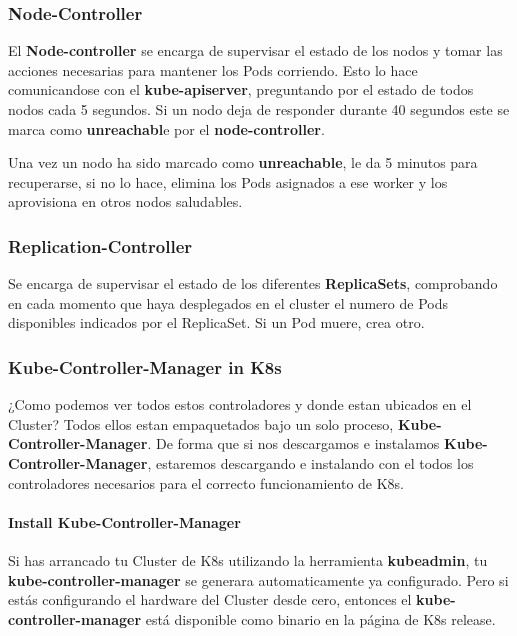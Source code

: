 \documentclass{article}
\begin{document}
\subsubsection{Node-Controller}
El \textbf{Node-controller} se encarga de supervisar el estado de los nodos y tomar las acciones necesarias para mantener los Pods corriendo. Esto lo hace comunicandose con el \textbf{kube-apiserver}, preguntando por el estado de todos nodos cada 5 segundos. Si un nodo deja de responder durante 40 segundos este se marca como \textbf{unreachabl}e por el \textbf{node-controller}.

Una vez un nodo ha sido marcado como \textbf{unreachable}, le da 5 minutos para recuperarse, si no lo hace, elimina los Pods asignados a ese worker y los aprovisiona en otros nodos saludables.

\subsubsection{Replication-Controller}
Se encarga de supervisar el estado de los diferentes \textbf{ReplicaSets}, comprobando en cada momento que haya desplegados en el cluster el numero de Pods disponibles indicados por el ReplicaSet. Si un Pod muere, crea otro.

\subsubsection{Kube-Controller-Manager in K8s}

¿Como podemos ver todos estos controladores y donde estan ubicados en el Cluster? Todos ellos estan empaquetados bajo un solo proceso, \textbf{Kube-Controller-Manager}. De forma que si nos descargamos e instalamos \textbf{Kube-Controller-Manager}, estaremos descargando e instalando con el todos los controladores necesarios para el correcto funcionamiento de K8s.

\paragraph{Install Kube-Controller-Manager}

Si has arrancado tu Cluster de K8s utilizando la herramienta \textbf{kubeadmin}, tu \textbf{kube-controller-manager} se generara automaticamente ya configurado. Pero si estás configurando el hardware del Cluster desde cero, entonces el \textbf{kube-controller-manager} está disponible como binario en la página de K8s release.
\end{document}
